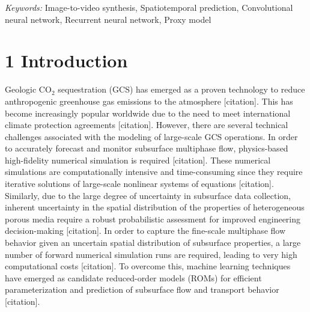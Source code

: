 \documentclass[10pt, twoside]{article}
\begin{document}
\textit{Keywords:} Image-to-video synthesis, Spatiotemporal prediction, Convolutional neural network, Recurrent neural network, Proxy model

\section*{\textbf{1 Introduction}}
Geologic CO$_2$ sequestration (GCS) has emerged as a proven technology to reduce anthropogenic greenhouse gas emissions to the atmosphere [citation]. This has become increasingly popular worldwide due to the need to meet international climate protection agreements [citation]. However, there are several technical challenges associated with the modeling of large-scale GCS operations. In order to accurately forecast and monitor subsurface multiphase flow, physics-based high-fidelity numerical simulation is required [citation]. These numerical simulations are computationally intensive and time-consuming since they require iterative solutions of large-scale nonlinear systems of equations [citation]. Similarly, due to the large degree of uncertainty in subsurface data collection, inherent uncertainty in the spatial distribution of the properties of heterogeneous porous media require a robust probabilistic assessment for improved engineering decision-making [citation]. In order to capture the fine-scale multiphase flow behavior given an uncertain spatial distribution of subsurface properties, a large number of forward numerical simulation runs are required, leading to very high computational costs [citation]. To overcome this, machine learning techniques have emerged as candidate reduced-order models (ROMs) for efficient parameterization and prediction of subsurface flow and transport behavior [citation].
\end{document}
